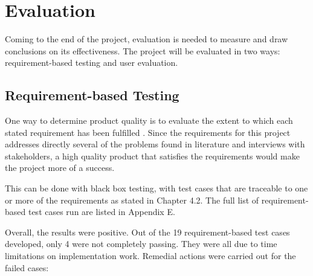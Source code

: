 \chapter{Evaluation}

Coming to the end of the project, evaluation is needed to measure and draw conclusions
on its effectiveness. The project will be evaluated in two ways:
requirement-based testing and user evaluation.

\section{Requirement-based Testing}

One way to determine product quality is to evaluate the extent to which each stated requirement
has been fulfilled \citep{bach1999risk}. Since the requirements for this project addresses directly
several of the problems found in literature and interviews with stakeholders, a high quality product
that satisfies the requirements would make the project more of a success.

This can be done with black box testing, with test cases that are traceable to one or more of
the requirements as stated in Chapter 4.2.
The full list of requirement-based test cases run are listed in Appendix E.

Overall, the results were positive.
Out of the 19 requirement-based test cases developed, only 4 were not completely passing.
They were all due to time limitations on implementation work.
Remedial actions were carried out for the failed cases:

